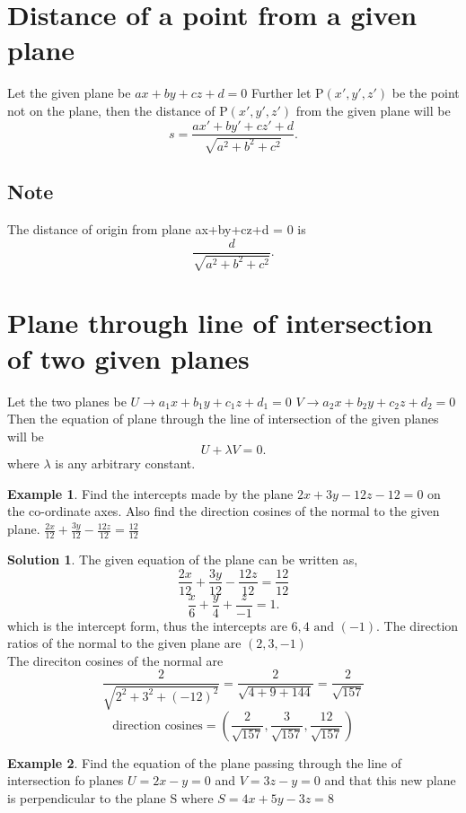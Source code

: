 \documentclass{article}
\theoremstyle{definition}
\newtheorem{example}{Example}[section]
\newtheorem*{solution}{Solution}
\begin{document}
\section*{Distance of a point from a given plane}
Let the given plane be $ax+by+cz+d=0$ \newline
Further let $\text{P}(x',y',z')$ be the point not on the plane, then the distance of $\text{P}(x',y',z')$ from the given plane will be
\[
	s = \dfrac{ax'+by'+cz'+d}{\sqrt{a^{2}+b^{2}+c^{2}}}
.\]
\subsection*{Note}
The distance of origin from plane ax+by+cz+d = 0 is \[
	\dfrac{d}{\sqrt{a^{2}+b^{2}+c^{2}}} \tag*{(Put x=y=z=0)}
.\]
\section*{Plane through line of intersection of two given planes}
Let the two planes be \newline
$U \rightarrow a_{1}x+b_{1}y+c_{1}z+d_{1}=0$ \newline
$V \rightarrow a_{2}x+b_{2}y+c_{2}z+d_{2}=0$ \newline \newline
Then the equation of plane through the line of intersection of the given planes will be
\[
	\boxed{U+\lambda V} = 0
.\]
where $\lambda$ is any arbitrary constant.
\begin{example}
	Find the intercepts made by the plane $2x+3y-12z-12 =0$ on the co-ordinate axes. Also find the direction cosines of the normal to the given plane.
$\frac{2x}{12}+ \frac{3y}{12} -\frac{12z}{12} = \frac{12}{12}$
\end{example}
\begin{solution}
	The given equation of the plane can be written as, \[\frac{2x}{12}+ \frac{3y}{12} -\frac{12z}{12} = \frac{12}{12}\]
	\[
	\frac{x}{6}+ \frac{y}{4}+ \frac{z}{-1} = 1
	.\]
	which is the intercept form, thus the intercepts are $6, 4 \text{ and } (-1)$.
	The direction ratios of the normal to the given plane are  $ \text{}(2, 3, -1)$\\
	The direciton cosines of the normal are 
	\[ \frac{2}{\sqrt{2^{2}+3^{2}+ (-12)^{2}}} = \frac{2}{\sqrt{4+9+144}}= \frac{2}{\sqrt{157}} \]
	\[ \text{direction cosines} = \left( \frac{2}{\sqrt{157}} ,\frac{3}{\sqrt{157}}, \frac{12}{\sqrt{157}}\right) \] 
\end{solution}
\begin{example}
	Find the equation of the plane passing through the line of intersection fo planes $U=2x-y =0$ and $V=3z-y=0$ and that this new plane is perpendicular to the plane S where $S = 4x+5y-3z=8$
\end{example}
\end{document}
